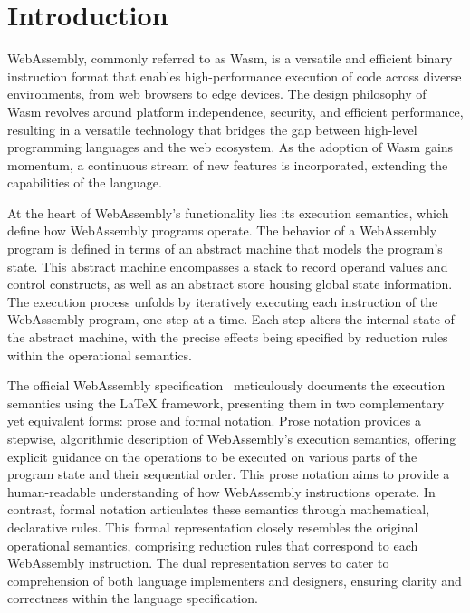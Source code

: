 \section{Introduction}\label{sec:intro}

WebAssembly, commonly referred to as Wasm, is a versatile and efficient
binary instruction format that enables high-performance execution of code
across diverse environments, from web browsers to edge devices. The design
philosophy of Wasm revolves around platform independence, security, and
efficient performance, resulting in a versatile technology that bridges the gap
between high-level programming languages and the web ecosystem. As the adoption
of Wasm gains momentum, a continuous stream of new features is incorporated,
extending the capabilities of the language.

At the heart of WebAssembly's functionality lies its execution semantics, which
define how WebAssembly programs operate. The behavior of a WebAssembly program
is defined in terms of an abstract machine that models the program's state.
This abstract machine encompasses a stack to record operand values and control
constructs, as well as an abstract store housing global state information. The
execution process unfolds by iteratively executing each instruction of the
WebAssembly program, one step at a time. Each step alters the internal state of
the abstract machine, with the precise effects being specified by reduction
rules within the operational semantics.

The official WebAssembly specification~\cite{wasmspec} meticulously documents
the execution semantics using the LaTeX framework, presenting them in two
complementary yet equivalent forms: prose and formal notation. Prose notation
provides a stepwise, algorithmic description of WebAssembly's execution
semantics, offering explicit guidance on the operations to be executed on
various parts of the program state and their sequential order. This prose
notation aims to provide a human-readable understanding of how WebAssembly
instructions operate.  In contrast, formal notation articulates these semantics
through mathematical, declarative rules. This formal representation closely
resembles the original operational semantics, comprising reduction rules that
correspond to each WebAssembly instruction. The dual representation serves to
cater to comprehension of both language implementers and designers, ensuring
clarity and correctness within the language specification.

